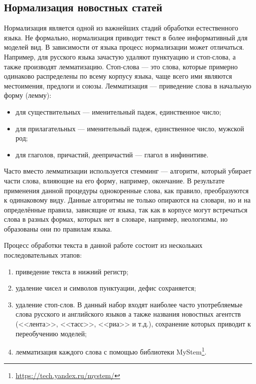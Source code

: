 \documentclass[a4paper, 14pt]{extarticle}
\begin{document}
\subsection{Нормализация новостных статей}
Нормализация является одной из важнейших стадий обработки естественного языка. Не формально, нормализация приводит текст в 
более информативный для моделей вид. В зависимости от языка процесс нормализации может отличаться. Например, для русского языка
зачастую удаляют пунктуацию и стоп-слова, а также производят лемматизацию. Стоп-слова --- это слова, которые примерно 
одинаково распределены по всему корпусу языка, чаще всего ими являются местоимения, предлоги и союзы. Лемматизация --- 
приведение слова в начальную форму (лемму):
\begin{itemize}
	\item для существительных --- именительный падеж, единственное число;
	\item для прилагательных --- именительный падеж, единственное число, мужской род;
	\item для глаголов, причастий, деепричастий --- глагол в инфинитиве.
\end{itemize}

Часто вместо лемматизации используется стемминг --- алгоритм, который убирает части 
слова, влияющие на его форму, например, окончание. В результате применения данной процедуры однокоренные слова, как правило,
преобразуются к одинаковому виду. Данные алгоритмы не только опираются на словари, но и на 
определённые правила, зависящие от языка, так как в корпусе могут встречаться слова в разных формах, которых нет в 
словаре, например, неологизмы, но образованы они по правилам языка.

Процесс обработки текста в данной работе состоит из нескольких последовательных этапов:
\begin{enumerate}
	\item приведение текста в нижний регистр;
	\item удаление чисел и символов пунктуации, дефис сохраняется;
	\item удаление стоп-слов. В данный набор входят наиболее часто употребляемые слова русского и английского языков
	а также названия новостных агентств (<<лента>>, <<тасс>>, <<риа>> и т.д.), сохранение которых приводит к 
	переобучению моделей;
	\item лемматизация каждого слова с помощью библиотеки MyStem\footnote{\url{https://tech.yandex.ru/mystem/}}.
\end{enumerate}
\end{document}
